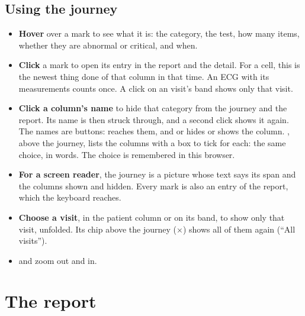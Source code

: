 \subsection{Using the journey}
\label{sec:patients-journey-use}

\begin{itemize}
\item \textbf{Hover} over a mark to see what it is: the category, the test, how many items,
  whether they are abnormal or critical, and when.
\item \textbf{Click} a mark to open its entry in the report and the detail. For a cell, this is
  the newest thing done of that column in that time. An ECG with its measurements counts once. A click on an visit's band shows only that
  visit.
\item \textbf{Click a column's name} to hide that category from the journey and the report. Its
  name is then struck through, and a second click shows it again. The names are buttons:
   reaches them, and  or  hides or shows the column.
  , above the journey, lists the columns with a box to tick for each: the same
  choice, in words. The choice is remembered in this browser.
\item \textbf{For a screen reader}, the journey is a picture whose text says its span and the
  columns shown and hidden. Every mark is also an entry of the report, which the keyboard
  reaches.
\item \textbf{Choose a visit}, in the patient column or on its band, to show only that visit,
  unfolded. Its chip above the journey ($\times$) shows all of them again (``All visits'').
\item \ui{$-$} and \ui{+} zoom out and in.
\end{itemize}

\section{The report}
\label{sec:patients-report}

